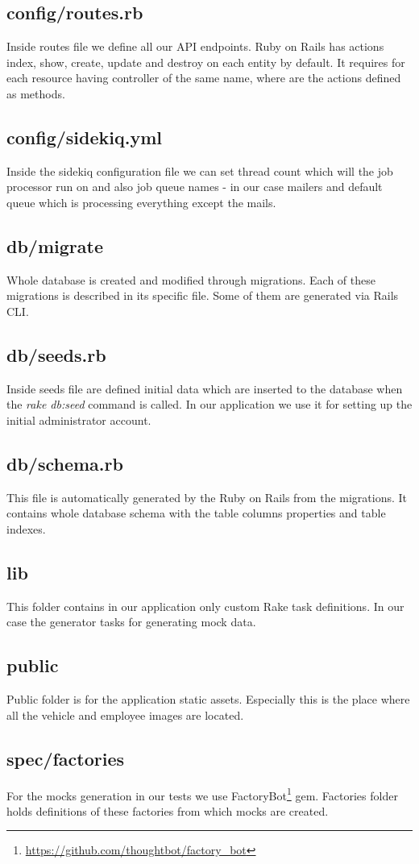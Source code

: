 	\subsection{config/routes.rb}
		Inside routes file we define all our API endpoints. Ruby on Rails has actions index, show, create, update and destroy on each entity by default. It requires for each resource having controller of the same name, where are the actions defined as methods.
	\subsection{config/sidekiq.yml}
		Inside the sidekiq configuration file we can set thread count which will the job processor run on and also job queue names - in our case mailers and default queue which is processing everything except the mails.
	\subsection{db/migrate}
		Whole database is created and modified through migrations. Each of these migrations is described in its specific file. Some of them are generated via Rails CLI.
	\subsection{db/seeds.rb}
		Inside seeds file are defined initial data which are inserted to the database when the \textit{rake db:seed} command is called. In our application we use it for setting up the initial administrator account.
	\subsection{db/schema.rb}
		This file is automatically generated by the Ruby on Rails from the migrations. It contains whole database schema with the table columns properties and table indexes.
	\subsection{lib}
		This folder contains in our application only custom Rake task definitions. In our case the generator tasks for generating mock data.
	\subsection{public}
		Public folder is for the application static assets. Especially this is the place where all the vehicle and employee images are located.
	\subsection{spec/factories}
		For the mocks generation in our tests we use FactoryBot\footnote{\url{https://github.com/thoughtbot/factory_bot}} gem. Factories folder holds definitions of these factories from which mocks are created.

